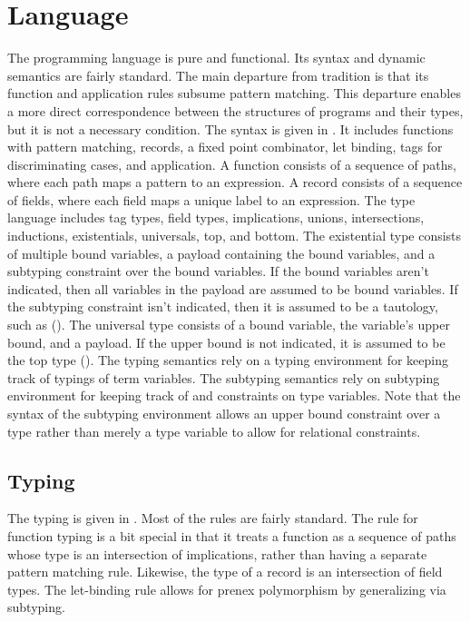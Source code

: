 \documentclass[acmsmall]{acmart}
\begin{document}
\section{Language}
The programming language is pure and functional. Its syntax and dynamic semantics 
are fairly standard. The main departure from tradition is that its function
and application rules subsume pattern matching. This departure enables a more direct  
correspondence between the structures of programs and their types, but it is 
not a necessary condition.
The syntax is given in .
It includes functions with pattern matching, records, a fixed point combinator, let binding, 
tags for discriminating cases, and application.
A function consists of a sequence of paths, where each path maps a pattern to an expression.
A record consists of a sequence of fields, where each field maps a unique label to an expression. 
The type language includes tag types, field types, implications, unions, intersections, 
inductions, existentials, universals, top, and bottom. 
The existential type consists of multiple bound variables, a payload containing the bound variables, 
and a subtyping constraint over the bound variables. 
If the bound variables aren't indicated, then all variables in the payload are
assumed to be bound variables. If the subtyping constraint isn't indicated, then it is assumed to 
be a tautology, such as ().
The universal type consists of a bound variable, the variable's upper bound, and a payload. If the upper
bound is not indicated, it is assumed to be the top type ().
The typing semantics rely on a typing environment for keeping track of typings of term variables.
The subtyping semantics rely on subtyping environment for keeping track of and constraints on type variables. 
Note that the syntax of the subtyping environment allows an upper bound constraint over a type
rather than merely a type variable to allow for relational constraints. 




\subsection{Typing}
The typing is given in .
Most of the rules are fairly standard. 
The rule for function typing is a bit special in that
it treats a function as a sequence of paths whose type is an intersection of implications,
rather than having a separate pattern matching rule. 
Likewise, the type of a record is an intersection of field types.
The let-binding rule allows for prenex polymorphism by generalizing via subtyping. 
\end{document}
